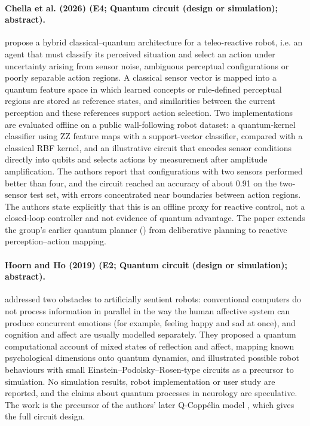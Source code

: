 \documentclass[10pt,a4paper]{article}
\begin{document}
\paragraph{Chella et al. (2026) (E4; Quantum circuit (design or simulation); abstract).} \citet{Chella2026} propose a hybrid classical--quantum architecture for a teleo-reactive robot, i.e. an agent that must classify its perceived situation and select an action under uncertainty arising from sensor noise, ambiguous perceptual configurations or poorly separable action regions. A classical sensor vector is mapped into a quantum feature space in which learned concepts or rule-defined perceptual regions are stored as reference states, and similarities between the current perception and these references support action selection. Two implementations are evaluated offline on a public wall-following robot dataset: a quantum-kernel classifier using ZZ feature maps with a support-vector classifier, compared with a classical RBF kernel, and an illustrative circuit that encodes sensor conditions directly into qubits and selects actions by measurement after amplitude amplification. The authors report that configurations with two sensors performed better than four, and the circuit reached an accuracy of about 0.91 on the two-sensor test set, with errors concentrated near boundaries between action regions. The authors state explicitly that this is an offline proxy for reactive control, not a closed-loop controller and not evidence of quantum advantage. The paper extends the group's earlier quantum planner (\citep{Chella2022}) from deliberative planning to reactive perception--action mapping.

\paragraph{Hoorn and Ho (2019) (E2; Quantum circuit (design or simulation); abstract).} \citet{Hoorn2019} addressed two obstacles to artificially sentient robots: conventional computers do not process information in parallel in the way the human affective system can produce concurrent emotions (for example, feeling happy and sad at once), and cognition and affect are usually modelled separately. They proposed a quantum computational account of mixed states of reflection and affect, mapping known psychological dimensions onto quantum dynamics, and illustrated possible robot behaviours with small Einstein--Podolsky--Rosen-type circuits as a precursor to simulation. No simulation results, robot implementation or user study are reported, and the claims about quantum processes in neurology are speculative. The work is the precursor of the authors' later Q-Coppélia model \citep{Ho2022}, which gives the full circuit design.
\end{document}
